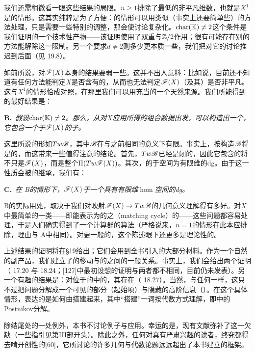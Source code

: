 我们还需稍微看一眼这些结果的局限。$n \geq 1$排除了最低的非平凡维数，也就是$X^1$是\trRiemann\trSurface{}的情形。这其实纯粹是为了方便：\trRiemann\trSurface{}的情形可以用类似（事实上还要简单些）的方法处理，只是需要一些特别的调整，那会使讨论复杂化。$\mathrm{char}(\mathbb{K}) \neq 2$这个条件是我们证明的一个技术性产物——该证明使用了双重\trBranchedCover{}与$\mathbb{Z}/2$作用；很有可能存在别的方法能解除这一限制。另一个要求$d \neq 2$则多少更本质一些，我们把对它的讨论推迟到后面（见\trhRemark{} 19.8）。

如前所说，对$\mathscr{F}(X)$本身的结果要弱一些。这并不出人意料：比如说，目前还不知道有任何方法能判定$X$是否含有\trClosed{}的\trExact\trLagrange\trSubmanifold，从而也无法判定$\mathscr{F}(X)$（及其\trDerivedCategory）是否非平凡。这与$X^1$的情形恰成对照，在那里我们可以用\trVanishingCycle{}充当\trObject{}的一个天然来源。我们所能得到的最好结果是：

\textbf{\trhTheorem{} B.}\ \emph{假设$\mathrm{char}(\mathbb{K}) \neq 2$。那么，从对$X$应用\trPicardLefschetzTheory{}所得的组合数据出发，可以构造出一个\trACategory，它包含一个\trQuasiequivalence{}于$\mathscr{F}(X)$的\trFull{}子\trCategory。}

这里所说的\trACategory{}形如$Tw\mathscr{B}$，其中$\mathscr{B}$在与之前相同的意义下有限。事实上，按构造$\mathscr{B}$将是\trDirected{}的，而这带来一些值得注意的结论。首先，$Tw\mathscr{B}$已经是\trSplitting{}闭的，因此它包含的将不只是$\mathscr{F}(X)$，而是整个$\Pi(Tw\mathscr{F}(X))$。其次，\trDirected{}的\trACategory{}\trQuasiisomorphism{}于\trMorphism{}空间为有限维的dg\trCategory。由于这一性质会被\trTwistedComplex{}的\trCategory{}继承，我们有：

\textbf{\trhCorollary{} C.}\ \emph{在\trhTheorem{} B的情形下，$\mathscr{F}(X)$\trQuasiisomorphism{}于一个具有有限维$\hom$空间的dg\trCategory。}

\trhTheorem{} B的实际用处，取决于我们对映射$\mathscr{F}(X) \to Tw\mathscr{B}$的几何意义理解得有多好。对$X$中最简单的一类\trLagrange\trSubmanifold——即能表示为\trHyperplaneSection{}的\trLefschetzPencil{}之\trMatchingCycle（matching cycle）的\trLagrange\trSphere——这些问题都容易处理，于是人们确实得到了一个计算\trFloerCohomology{}群的算法（严格说来，$n=1$的情形在此本应排除，理由与\trhTheorem{} A中相同）。对更一般的\trLagrange\trSubmanifold，这个陈述眼下还更多是理论性的。

上述结果的证明将在§19给出；它们会用到全书引入的大部分材料。作为一个自然的副产品，我们建立了\trVanishingCycle{}的\trHurwitz{}移动与\trDirected{}\trFukayaCategory{}的\trMutation{}之间的一般关系。事实上，我们会给出两个证明（\trhTheorem{} 17.20 与\trhTheorem{} 18.24；[127]中最初设想的证明与两者都不相同，目前仍未发表）。另一个有趣的结果是：对位于\trLefschetzFibration{}的\trTotalSpace{}中的\trLagrange\trSubmanifold，其\trFloerCohomology{}存在\trSpectralSequence（\trhCorollary{} 18.27）。当然，与任何\trSpectralSequence{}一样，这只不过把问题分解成一个可见的部分（起始项）与隐藏的高阶信息（\trDifferential）。在这个具体情形，\trDifferential{}表达的是\trLagrange\trSubmanifold{}如何由\trLefschetzThimble{}搭建起来，其中“搭建”一词按代数方式理解，即\trFukayaCategory{}中的Postnikov分解。

除结尾处的一处例外，本书不讨论例子与应用。幸运的是，现有文献弥补了这一欠缺（一些指引见第III部开头）。除此之外，任何对\trFukayaCategory{}真有严肃兴趣的读者，终究都得去啃开创性的[60]，它所讨论的许多几何与代数论题远远超出了本书建立的框架。
